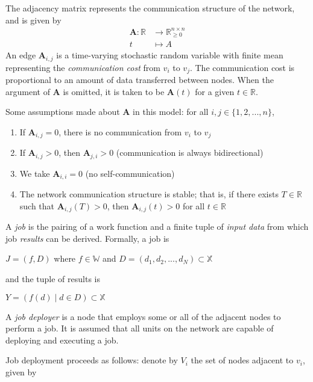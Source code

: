 \documentclass[../mthe-493-project-proposal.tex]{subfiles}
\begin{document}
    The adjacency matrix represents the communication structure of the network, and is given by
    \begin{align*}
        \mathbf{A} \colon \mathbb{R} &\to \mathbb{R}^{n \times n}_{\geq 0} \\
        t &\mapsto A
    \end{align*}
    An edge $\mathbf{A}_{i,j}$ is a time-varying stochastic random variable with finite mean representing the \textit{communication cost} from $v_i$ to $v_j$. The communication cost is proportional to an amount of data transferred between nodes. When the argument of $\mathbf{A}$ is omitted, it is taken to be $\mathbf{A}(t)$ for a given $t \in \mathbb{R}$.
    
    Some assumptions made about $\mathbf{A}$ in this model: for all $i, j \in \{1, 2, ..., n\}$,
    
    \begin{enumerate}
        \item If $\mathbf{A}_{i,j} = 0$, there is no communication from $v_i$ to $v_j$
        \item If $\mathbf{A}_{i,j} > 0$, then $\mathbf{A}_{j,i} > 0$ (communication is always bidirectional)
        \item We take $\mathbf{A}_{i,i} = 0$ (no self-communication)
        \item The network communication structure is stable; that is, if there exists $T \in \mathbb{R}$ such that $\mathbf{A}_{i,j}(T) > 0$, then $\mathbf{A}_{i,j}(t) > 0$ for all $t \in \mathbb{R}$
    \end{enumerate}
    
    A \textit{job} is the pairing of a work function and a finite tuple of \textit{input data} from which job \textit{results} can be derived. Formally, a job is \\
    
    \centerline{\(J = (f, D)\) where \(f \in \mathbb{W}\) and \(D = (d_1, d_2, ..., d_N) \subset \mathbb{X}\)}
    
    and the tuple of results is
    
    \centerline{\(Y = (f(d) \mid d \in D ) \subset \mathbb{X}\)}
    
    A \textit{job deployer} is a node that employs some or all of the adjacent nodes to perform a job. It is assumed that all units on the network are capable of deploying and executing a job. 
    
    Job deployment proceeds as follows: denote by $V_i$ the set of nodes adjacent to $v_i$, given by
    
\end{document}
